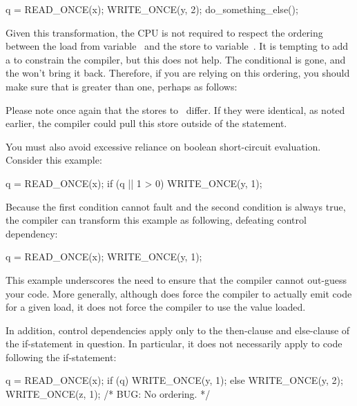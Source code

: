 \begin{VerbatimN}
q = READ_ONCE(x);
WRITE_ONCE(y, 2);
do_something_else();
\end{VerbatimN}

Given this transformation, the CPU is not required to respect the ordering
between the load from variable~ and the store to variable~.
It is tempting to add a  to constrain the compiler,
but this does not help.
The conditional is gone, and the  won't bring it back.
Therefore, if you are relying on this ordering, you should make sure
that  is greater than one, perhaps as follows:


Please note once again that the stores to~ differ.
If they were identical, as noted earlier, the compiler could pull this
store outside of the  statement.

You must also avoid excessive reliance on boolean short-circuit evaluation.
Consider this example:

\begin{VerbatimN}
q = READ_ONCE(x);
if (q || 1 > 0)
	WRITE_ONCE(y, 1);
\end{VerbatimN}

Because the first condition cannot fault and the second condition is
always true, the compiler can transform this example as following,
defeating control dependency:

\begin{VerbatimN}
q = READ_ONCE(x);
WRITE_ONCE(y, 1);
\end{VerbatimN}

This example underscores the need to ensure that the compiler cannot
out-guess your code.
More generally, although  does force
the compiler to actually emit code for a given load, it does not force
the compiler to use the value loaded.

In addition, control dependencies apply only to the then-clause and
else-clause of the if-statement in question.
In particular, it does
not necessarily apply to code following the if-statement:

\begin{VerbatimN}
q = READ_ONCE(x);
if (q)
	WRITE_ONCE(y, 1);
else
	WRITE_ONCE(y, 2);
WRITE_ONCE(z, 1);  /* BUG: No ordering. */
\end{VerbatimN}

